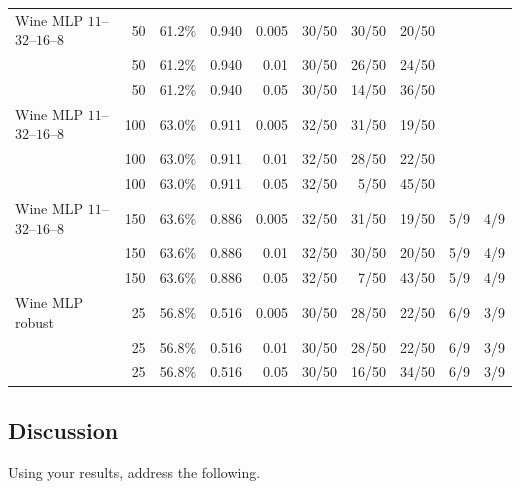 \documentclass[11pt,a4paper]{article}
\begin{document}
\begin{center}
{\begin{tabular}{lrrrrrrrrr}
  Wine MLP $11$--$32$--$16$--$8$ & 50 & 61.2\% & 0.940 & 0.005 & 30/50 & 30/50 & 20/50 & &\\
           & 50 & 61.2\% & 0.940 & 0.01 & 30/50 & 26/50 & 24/50 & &\\
           & 50 & 61.2\% & 0.940 & 0.05 & 30/50 & 14/50 & 36/50 & &\\
  Wine MLP $11$--$32$--$16$--$8$ & 100 & 63.0\% & 0.911 & 0.005 & 32/50 & 31/50 & 19/50 & &\\
           & 100 & 63.0\% & 0.911 & 0.01 & 32/50 & 28/50 & 22/50 & &\\
           & 100 & 63.0\% & 0.911 & 0.05 & 32/50 & 5/50 & 45/50 & & \\
  Wine MLP $11$--$32$--$16$--$8$ & 150 & 63.6\% & 0.886 & 0.005 & 32/50 & 31/50 & 19/50 & 5/9 & 4/9 \\
           & 150 & 63.6\% & 0.886 & 0.01 & 32/50 & 30/50 & 20/50 & 5/9 & 4/9 \\
           & 150 & 63.6\% & 0.886 & 0.05 & 32/50 & 7/50 & 43/50 & 5/9 & 4/9 \\
  Wine MLP robust & 25 & 56.8\% & 0.516 & 0.005 & 30/50 & 28/50 & 22/50 & 6/9 & 3/9 \\
           & 25 & 56.8\% & 0.516 & 0.01 & 30/50 & 28/50 & 22/50 & 6/9 & 3/9 \\
           & 25 & 56.8\% & 0.516 & 0.05 & 30/50 & 16/50 & 34/50 & 6/9 & 3/9 \\
  \bottomrule
\end{tabular}%
}
\end{center}
\newpage
\subsection*{Discussion}

Using your results, address the following.
\end{document}

